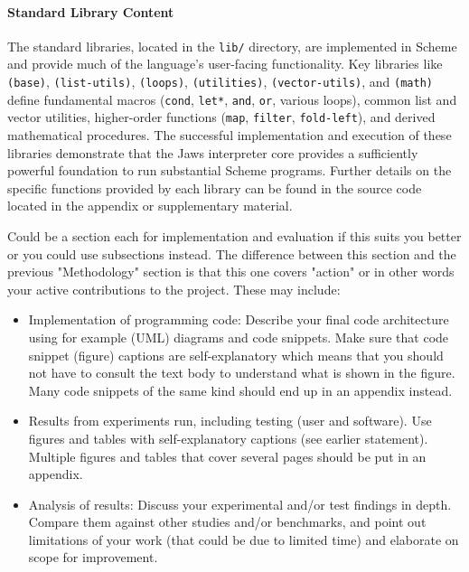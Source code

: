 \documentclass[final]{cmpreport_02}
\begin{document}
\paragraph{Standard Library Content}
The standard libraries, located in the \texttt{lib/} directory, are implemented in Scheme and provide much of the language's user-facing functionality. Key libraries like \texttt{(base)}, \texttt{(list-utils)}, \texttt{(loops)}, \texttt{(utilities)}, \texttt{(vector-utils)}, and \texttt{(math)} define fundamental macros (\texttt{cond}, \texttt{let*}, \texttt{and}, \texttt{or}, various loops), common list and vector utilities, higher-order functions (\texttt{map}, \texttt{filter}, \texttt{fold-left}), and derived mathematical procedures. The successful implementation and execution of these libraries demonstrate that the Jaws interpreter core provides a sufficiently powerful foundation to run substantial Scheme programs. Further details on the specific functions provided by each library can be found in the source code located in the appendix or supplementary material.






Could be a section each for implementation and evaluation if this suits you better or you could use subsections instead. The difference between this section and the previous "Methodology" section is that this one covers "action" or in other words your active contributions to the project. These may include:
\begin{itemize}
\item Implementation of programming code: Describe your final code architecture using for example (UML) diagrams and code snippets. Make sure that code snippet (figure) captions are self-explanatory which means that you should not have to consult the text body to understand what is shown in the figure. Many code snippets of the same kind should end up in an appendix instead.
\item Results from experiments run, including testing (user and software). Use figures and tables with self-explanatory captions (see earlier statement). Multiple figures and tables that cover several pages should be put in an appendix.
\item Analysis of results: Discuss your experimental and/or test findings in depth. Compare them against other studies and/or benchmarks, and point out limitations of your work (that could be due to limited time) and elaborate on scope for improvement.
\end{itemize}
\end{document}
